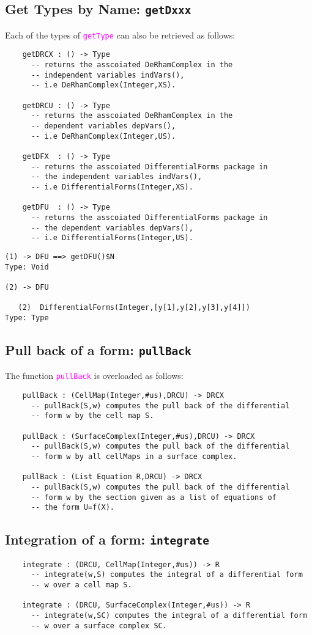 \documentclass[12pt,a4paper]{article}
\newcommand{\spadfun}[1]{\textcolor{magenta}{\tt #1}}
\begin{document}
\subsection{Get Types by Name: {\tt getDxxx}}
Each of the types of \spadfun{getType} can also be retrieved
as follows:
\begin{lstlisting}
    getDRCX : () -> Type
      -- returns the asscoiated DeRhamComplex in the 
      -- independent variables indVars(), 
      -- i.e DeRhamComplex(Integer,XS).
      
    getDRCU : () -> Type
      -- returns the asscoiated DeRhamComplex in the 
      -- dependent variables depVars(), 
      -- i.e DeRhamComplex(Integer,US).   
      
    getDFX  : () -> Type    
      -- returns the asscoiated DifferentialForms package in 
      -- the independent variables indVars(), 
      -- i.e DifferentialForms(Integer,XS).
      
    getDFU  : () -> Type
      -- returns the asscoiated DifferentialForms package in 
      -- the dependent variables depVars(), 
      -- i.e DifferentialForms(Integer,US).
\end{lstlisting}
\scriptsize
\begin{verbatim}
(1) -> DFU ==> getDFU()$N
Type: Void

(2) -> DFU

   (2)  DifferentialForms(Integer,[y[1],y[2],y[3],y[4]])
Type: Type
\end{verbatim}
\normalsize
%
\subsection{Pull back of a form: {\tt pullBack}}
The function \spadfun{pullBack} is overloaded as follows:
\begin{lstlisting}
    pullBack : (CellMap(Integer,#us),DRCU) -> DRCX
      -- pullBack(S,w) computes the pull back of the differential
      -- form w by the cell map S.
      
    pullBack : (SurfaceComplex(Integer,#us),DRCU) -> DRCX
      -- pullBack(S,w) computes the pull back of the differential
      -- form w by all cellMaps in a surface complex.

    pullBack : (List Equation R,DRCU) -> DRCX
      -- pullBack(S,w) computes the pull back of the differential
      -- form w by the section given as a list of equations of 
      -- the form U=f(X).
\end{lstlisting}
%
\subsection{Integration of a form: {\tt integrate}}
\begin{lstlisting}
    integrate : (DRCU, CellMap(Integer,#us)) -> R
	  -- integrate(w,S) computes the integral of a differential form
	  -- w over a cell map S.
	  
    integrate : (DRCU, SurfaceComplex(Integer,#us)) -> R
	  -- integrate(w,SC) computes the integral of a differential form
	  -- w over a surface complex SC.
\end{lstlisting}
%
%
%
\end{document}
